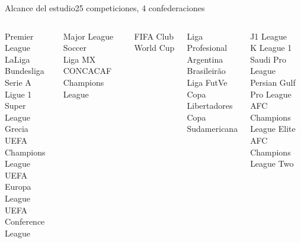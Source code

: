 \documentclass[aspectratio=169,11pt]{beamer}
\begin{document}
\begin{frame}{Alcance del estudio}{25 competiciones, 4 confederaciones}
	\vspace*{-0.3cm}
	\begin{columns}[T,onlytextwidth]
		\par\vskip 2mm
		\scriptsize
		Premier League \\
		LaLiga \\
		Bundesliga \\
		Serie A \\
		Ligue 1 \\
		Super League Grecia \\
		UEFA Champions League \\
		UEFA Europa League \\
		UEFA Conference League
		\par\vskip 2mm
		\scriptsize
		Major League Soccer \\
		Liga MX \\
		CONCACAF Champions League
		\vskip 4mm
		\par\vskip 2mm
		\scriptsize
		FIFA Club World Cup
		\par\vskip 2mm
		\scriptsize
		Liga Profesional Argentina \\
		Brasileir\~ao \\
		Liga FutVe \\
		Copa Libertadores \\
		Copa Sudamericana
		\par\vskip 2mm
		\scriptsize
		J1 League \\
		K League 1 \\
		Saudi Pro League \\
		Persian Gulf Pro League \\
		AFC Champions League Elite \\
		AFC Champions League Two
	\end{columns}
\end{frame}
\end{document}
